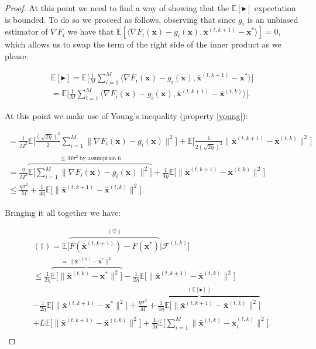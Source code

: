 \begin{proof}
At this point we need to find a way of showing that the $\mathbb{E}[\blacktriangleright]$ expectation is bounded. To do so we proceed as follows, observing that since $g_i$ is an unbiased estimator of $\nabla F_i$ we have that $ \mathbb{E}[\langle \nabla F_i(\bm{x}) - g_i(\bm{x})  ,\bar{\bm{x}}^{(t,k+1)} - \bm{x}^{*} \rangle]=0$, which allows us to swap the term of the right side of the inner product as we please:

\begin{align*}
    \mathbb{E}[\blacktriangleright] = \mathbb{E} \Bigg[ \frac{1}{M} \sum_{i=1}^M  \langle \nabla F_i(\bm{x}) - g_i(\bm{x})  ,\bar{\bm{x}}^{(t,k+1)} - \bm{x}^{*} \rangle \Bigg]  \\
     = \mathbb{E} \Bigg[ \frac{1}{M} \sum_{i=1}^M  \langle \nabla F_i(\bm{x}) - g_i(\bm{x})  ,\bar{\bm{x}}^{(t,k+1)} - \bar{\bm{x}}^{(t,k)} \rangle \Bigg].
\end{align*}

At this point we make use of Young's inequality (property \ref{young}):

\begin{align*}
     = \frac{1}{M^2} \mathbb{E} \Bigg[ \frac{(\sqrt{2\eta})^2}{2} \sum_{i=1}^M  \| \nabla F_i(\bm{x}) - g_i(\bm{x}) \|^2 \Bigg] +  \mathbb{E} \Bigg[ \frac{1}{2(\sqrt{2\eta})^2} \| \bar{\bm{x}}^{(t,k+1)} - \bar{\bm{x}}^{(t,k)} \|^2 \Bigg]\\
    = \frac{\eta}{M^2}\overbrace{ \mathbb{E} \Bigg[ \sum_{i=1}^M  \| \nabla F_i(\bm{x}) - g_i(\bm{x}) \|^2 \Bigg]}^{\leq M\sigma^2 ~ \text{by assumption 6}} +  \frac{1}{4\eta} \mathbb{E} \Bigg[  \| \bar{\bm{x}}^{(t,k+1)} - \bar{\bm{x}}^{(t,k)} \|^2 \Bigg]\\
    \leq \frac{\eta \sigma^2}{M} + \frac{1}{4\eta} \mathbb{E}   \Bigg[  \| \bar{\bm{x}}^{(t,k+1)} - \bar{\bm{x}}^{(t,k)} \|^2 \Bigg].
\end{align*}


Bringing it all together we have: 

\begin{align*}
    (\dagger) = \mathbb{E} \Big[ \overbrace{F(\bar{\bm{x}}^{(t,k+1)}) - F(\bm{x}^*)}^{(\heartsuit)} | \mathcal{F}^{(t,k)}\Big]\\
    \leq \frac{1}{2\eta}\overbrace{ \mathbb{E} \Bigg[
        \|  \bar{\bm{x}}^{(t,k)} - \bm{x}^{*} \|^2 \Bigg]}^{= \|  \bar{\bm{x}}^{(t,k)} - \bm{x}^{*} \|^2}
    -  \frac{1}{2\eta} \mathbb{E} \Bigg[ \|  \bar{\bm{x}}^{(t,k+1)} - \bar{\bm{x}}^{(t,k)} \|^2 \Bigg] \\
    - \frac{1}{2\eta}  \mathbb{E} \Bigg[ \| \bar{\bm{x}}^{(t,k+1)} - \bm{x}^{*} \|^2  \Bigg] 
    +  \overbrace{ \frac{\eta \sigma^2}{M} + \frac{1}{4\eta} \mathbb{E}   \Bigg[  \| \bar{\bm{x}}^{(t,k+1)} - \bar{\bm{x}}^{(t,k)} \|^2 \Bigg] }^{(\mathbb{E}[\blacktriangleright])}
    \\+ L \mathbb{E} \Bigg[ \|\bar{\bm{x}}^{(t,k+1)}-\bar{\bm{x}}^{(t,k)} \|^2  \Bigg]  + \frac{L}{M}  \mathbb{E} \Bigg[ \sum_{i=1}^M \|\bar{\bm{x}}^{(t,k)}-\bm{x}_i^{(t,k)} \|^2 \Bigg]. \\
\end{align*}


\end{proof}
